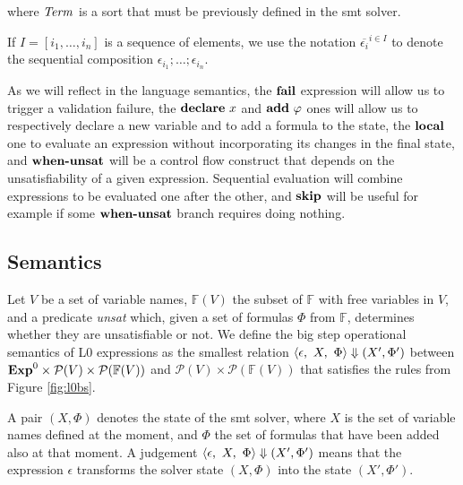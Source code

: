 where $\mathit{Term}$ is a sort that must be previously defined in the \acrshort{smt}
solver.

If $I = [i_1, \ldots, i_n]$ is a sequence of elements, we use the notation
$\overline{\epsilon_i}^{i \in I}$ to denote the sequential composition 
$\epsilon_{i_1};\dots;\epsilon_{i_n}$.

As we will reflect in the language semantics, the $\textbf{fail}$ expression will allow
us to trigger a validation failure, the $\textbf{declare}~x$ and $\textbf{add}~\varphi$ ones
will allow us to respectively declare a new variable and to add a formula to the
state, the $\textbf{local}$ one to evaluate an expression without incorporating its
changes in the final state, and $\textbf{when-unsat}$ will be a control flow construct
that depends on the unsatisfiability of a given expression.  Sequential
evaluation will combine expressions to be evaluated one after the other, and
$\textbf{skip}$ will be useful for example if some $\textbf{when-unsat}$ branch requires doing
nothing. 

\subsection{Semantics}

Let $V$ be a set of variable names, $\mathbb{F}(V)$ the subset of $\mathbb{F}$ 
with free variables in $V$, and a predicate \textit{unsat} which, given a set of
formulas $\Phi$ from $\mathbb{F}$, determines whether they are unsatisfiable or
not.  We define the big step operational semantics of L0 expressions as the
smallest relation $\langle \epsilon,~X,~\Phi\rangle \Downarrow (X', \Phi')$ between $\mathbf{Exp}^{0} \times
\mathcal{P}(V) \times \mathcal{P}({\mathbb{F}(V)})$ and $\mathcal{P}(V) \times
\mathcal{P}({\mathbb{F}(V)})$ that satisfies the rules from Figure
\ref{fig:l0bs}.

A pair $(X, \Phi)$ denotes the state of the \acrshort{smt} solver, where $X$ is 
the set of variable names defined at the moment, and $\Phi$ the set of formulas
that have been added also at that moment. A judgement
$\langle \epsilon,~X,~\Phi\rangle \Downarrow (X', \Phi')$ means that the expression $\epsilon$
transforms the solver state $(X, \Phi)$ into the state $(X', \Phi')$. 

